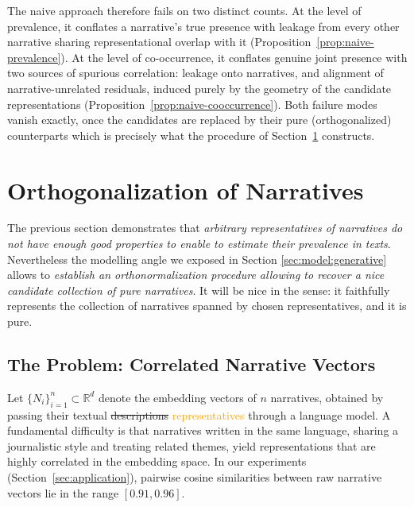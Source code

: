 \documentclass[
  journal=medium,
  manuscript=article-type,
  year=2025,
  volume=1,
]{cup-journal}
\newcommand{\R}{\mathbb{R}}
\begin{document}
The naive approach therefore fails on two distinct counts. At the level of
prevalence, it conflates a narrative's true presence with leakage from every
other narrative sharing representational overlap with it
(Proposition~\ref{prop:naive-prevalence}). At the level of co-occurrence, it
conflates genuine joint presence with two sources of spurious
correlation: leakage onto narratives, and alignment of narrative-unrelated residuals, induced purely by the geometry of the
candidate representations (Proposition~\ref{prop:naive-cooccurrence}). Both
failure modes vanish exactly, once the candidates are
replaced by their pure (orthogonalized) counterparts which is precisely
what the procedure of Section~\ref{sec:ortho} constructs.




\section{Orthogonalization of Narratives}
\label{sec:ortho}

{\color{ForestGreen}
The previous section demonstrates that \emph{arbitrary representatives of narratives do not have enough good properties to enable to estimate their prevalence in texts}.
Nevertheless the modelling angle we exposed in Section \ref{sec:model:generative} allows to \emph{establish an orthonormalization procedure allowing to recover a nice candidate collection of pure narratives}.
It will be nice in the sense: it faithfully represents the collection of narratives spanned by chosen representatives, and it is pure.
}

\subsection{The Problem: Correlated Narrative Vectors}
\label{sec:ortho:problem}

Let $\{N_i\}_{i=1}^{n} \subset \R^d$ denote the embedding vectors of $n$ narratives,
obtained by passing their textual \st{descriptions} \textcolor{Orange}{representatives} through a language model.
A fundamental difficulty is that narratives written in the same language,
sharing a journalistic style and treating related themes, yield representations
that are highly correlated in the embedding space.
In our experiments (Section~\ref{sec:application}), pairwise cosine similarities
between raw narrative vectors lie in the range $[0.91, 0.96]$.
\end{document}
